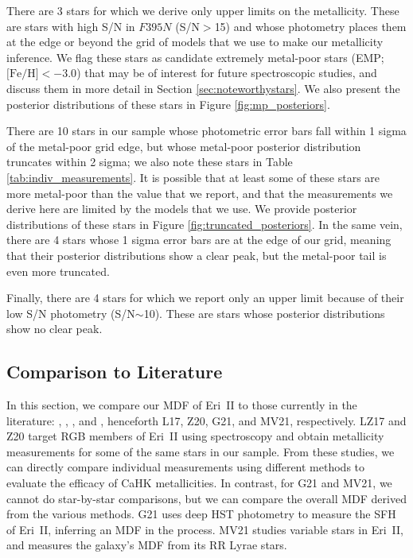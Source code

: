 \documentclass[twocolumn]{aastex63}
\begin{document}
\par There are 3 stars for which we derive only upper limits on the metallicity. These are stars with high S/N in $F395N$ (S/N$>$15) and whose photometry places them at the edge or beyond the grid of models that we use to make our metallicity inference. We flag these stars as candidate extremely metal-poor stars (EMP; $\mbox{[Fe/H]}<-3.0$) that may be of interest for future spectroscopic studies, and discuss them in more detail in Section \ref{sec:noteworthystars}. We also present the posterior distributions of these stars in Figure \ref{fig:mp_posteriors}.

\par There are 10 stars in our sample whose photometric error bars fall within 1 sigma of the metal-poor grid edge, but whose metal-poor posterior distribution truncates within 2 sigma; we also note these stars in Table \ref{tab:indiv_measurements}. It is possible that at least some of these stars are more metal-poor than the value that we report, and that the measurements we derive here are limited by the models that we use. We provide posterior distributions of these stars in Figure \ref{fig:truncated_posteriors}. In the same vein, there are 4 stars whose 1 sigma error bars are at the edge of our grid, meaning that their posterior distributions show a clear peak, but the metal-poor tail is even more truncated.

\par Finally, there are 4 stars for which we report only an upper limit because of their low S/N photometry (S/N$\sim$10). These are stars whose posterior distributions show no clear peak.

\subsection{Comparison to Literature}

\par In this section, we compare our MDF of Eri~II to those currently in the literature: \citet{li2017eriII}, \citet{zoutendijk2020eriII}, \citet{gallart2021eriii}, and \citet{martinezvazquez2021}, henceforth L17, Z20, G21, and MV21, respectively. LZ17 and Z20 target RGB members of Eri~II using spectroscopy and obtain metallicity measurements for some of the same stars in our sample. From these studies, we can directly compare individual measurements using different methods to evaluate the efficacy of CaHK metallicities. In contrast, for G21 and MV21, we cannot do star-by-star comparisons, but we can compare the overall MDF derived from the various methods. G21 uses deep HST photometry to measure the SFH of Eri~II, inferring an MDF in the process. MV21 studies variable stars in Eri~II, and measures the galaxy's MDF from its RR Lyrae stars.
\end{document}
